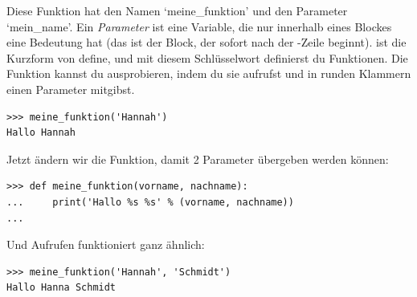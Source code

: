 Diese Funktion hat den Namen `meine\_funktion' und den Parameter `mein\_name'. Ein \emph{Parameter} ist eine Variable, die nur innerhalb eines Blockes eine Bedeutung hat (das ist der Block, der sofort nach der -Zeile beginnt).  ist die Kurzform von define, und mit diesem Schlüsselwort definierst du Funktionen. Die Funktion kannst du ausprobieren, indem du sie aufrufst und in runden Klammern einen Parameter mitgibst.

\begin{Verbatim}[frame=single]
>>> meine_funktion('Hannah')
Hallo Hannah
\end{Verbatim}


\noindent
Jetzt ändern wir die Funktion, damit 2 Parameter übergeben werden können:

\begin{Verbatim}[frame=single]
>>> def meine_funktion(vorname, nachname):
...     print('Hallo %s %s' % (vorname, nachname))
...
\end{Verbatim}

\noindent
Und Aufrufen funktioniert ganz ähnlich:

\begin{Verbatim}[frame=single]
>>> meine_funktion('Hannah', 'Schmidt')
Hallo Hanna Schmidt
\end{Verbatim}

